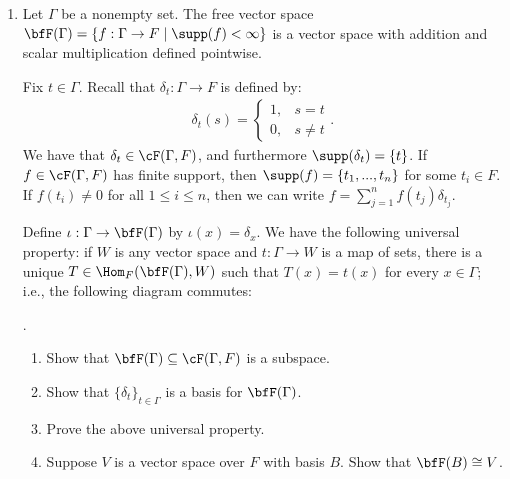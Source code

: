 \begin{example}
\begin{enumerate}[label = (\arabic*)]
            \item Let $\Gamma$ be a nonempty set. The free vector space $\bfF(\Gamma) = \{f:\Gamma \rightarrow F \mid \supp(f) < \infty \}$ is a vector space with addition and scalar multiplication defined pointwise. \nl
            
            Fix $t \in \Gamma$. Recall that $\delta_t:\Gamma \rightarrow F$ is defined by:
                \begin{equation*}
                \begin{split}
                    \delta_t (s) = \begin{cases} 1, & s = t \\ 0, & s \neq t \end{cases}.
                \end{split}
                \end{equation*}
            We have that $\delta_t \in \cF(\Gamma,F)$, and furthermore $\supp(\delta_t) = \{t \}$. If $f \in \cF(\Gamma,F)$ has finite support, then $\supp(f) = \{t_1,...,t_n\}$ for some $t_i \in F$. If $f(t_i) \neq 0$ for all $1\leq i \leq n$, then we can write $f = \sum_{j = 1}^n f(t_j) \delta_{t_j}$. \nl
            
            Define $\iota:\Gamma \rightarrow \bfF(\Gamma)$ by $\iota(x) = \delta_x$. We have the following universal property: if $W$ is any vector space and $t:\Gamma \rightarrow W$ is a map of sets, there is a unique $T \in \Hom_F(\bfF(\Gamma),W)$ such that $T(x) = t(x)$ for every $x \in \Gamma$; i.e., the following diagram commutes:
            \begin{center}
            .
            \end{center}
                \begin{exercise}\label{ex:free-vec}
                    \phantom{a}
                    \begin{enumerate}[label = (\arabic*)]
                        \item Show that $\bfF(\Gamma) \subseteq \cF(\Gamma,F)$ is a subspace.
                        \item Show that $\{\delta_t\}_{t \in \Gamma}$ is a basis for $\bfF(\Gamma)$.
                        \item Prove the above universal property.
                        \item Suppose $V$ is a vector space over $F$ with basis $B$. Show that $\bfF(B) \cong V$.
                    \end{enumerate}
                \end{exercise}
        \end{enumerate}
    \end{example}


